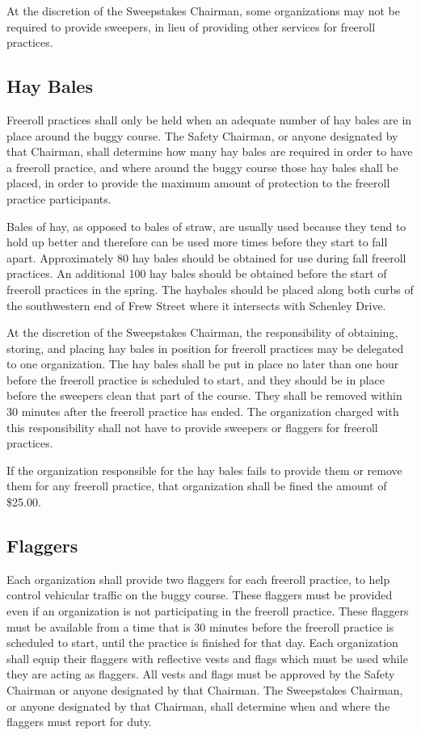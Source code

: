 \documentclass[openany]{book}
\begin{document}
At the discretion of the Sweepstakes Chairman, some organizations may not be required to provide sweepers, in lieu of providing other services for freeroll practices.

\subsection{Hay Bales}

Freeroll practices shall only be held when an adequate number of hay bales are in place around the buggy course. The Safety Chairman, or anyone designated by that Chairman, shall determine how many hay bales are required in order to have a freeroll practice, and where around the buggy course those hay bales shall be placed, in order to provide the maximum amount of protection to the freeroll practice participants.

Bales of hay, as opposed to bales of straw, are usually used because they tend to hold up better and therefore can be used more times before they start to fall apart. Approximately 80 hay bales should be obtained for use during fall freeroll practices. An additional 100 hay bales should be obtained before the start of freeroll practices in the spring. The haybales should be placed along both curbs of the southwestern end of Frew Street where it intersects with Schenley Drive.

At the discretion of the Sweepstakes Chairman, the responsibility of obtaining, storing, and placing hay bales in position for freeroll practices may be delegated to one organization. The hay bales shall be put in place no later than one hour before the freeroll practice is scheduled to start, and they should be in place before the sweepers clean that part of the course. They shall be removed within 30 minutes after the freeroll practice has ended. The organization charged with this responsibility shall not have to provide sweepers or flaggers for freeroll practices.

If the organization responsible for the hay bales fails to provide them or remove them for any freeroll practice, that organization shall be fined the amount of \$25.00.

\subsection{Flaggers}

Each organization shall provide two flaggers for each freeroll practice, to help control vehicular traffic on the buggy course. These flaggers must be provided even if an organization is not participating in the freeroll practice. These flaggers must be available from a time that is 30 minutes before the freeroll practice is scheduled to start, until the practice is finished for that day. Each organization shall equip their flaggers with reflective vests and flags which must be used while they are acting as flaggers. All vests and flags must be approved by the Safety Chairman or anyone designated by that Chairman. The Sweepstakes Chairman, or anyone designated by that Chairman, shall determine when and where the flaggers must report for duty.
\end{document}
